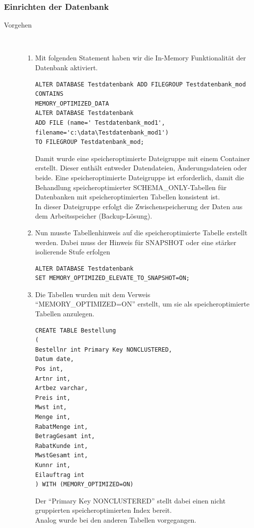\documentclass[a4paper, 12pt]{scrartcl}
\begin{document}
\subsubsection{Einrichten der Datenbank}
\begin{description}
	\item[Vorgehen]~\par 
	\begin{enumerate}
		\item Mit folgenden Statement haben wir die In-Memory Funktionalität der Datenbank aktiviert. 
		\begin{verbatim}
ALTER DATABASE Testdatenbank ADD FILEGROUP Testdatenbank_mod CONTAINS 
MEMORY_OPTIMIZED_DATA   
ALTER DATABASE Testdatenbank 
ADD FILE (name=' Testdatenbank_mod1', filename='c:\data\Testdatenbank_mod1') 
TO FILEGROUP Testdatenbank_mod;   
		\end{verbatim}
		Damit wurde eine speicheroptimierte Dateigruppe mit einem Container erstellt. Dieser enthält entweder Datendateien, Änderungsdateien oder beide. Eine speicheroptimierte Dateigruppe ist erforderlich, damit die Behandlung speicheroptimierter SCHEMA_ONLY-Tabellen für Datenbanken mit speicheroptimierten Tabellen konsistent ist.\\ 
		In dieser Dateigruppe erfolgt die Zwischenspeicherung der Daten aus dem Arbeitsspeicher (Backup-Lösung). 
		\item Nun musste Tabellenhinweis auf die speicheroptimierte Tabelle erstellt werden. Dabei muss der Hinweis für SNAPSHOT oder eine stärker isolierende Stufe erfolgen
		\begin{verbatim}
ALTER DATABASE Testdatenbank 
SET MEMORY_OPTIMIZED_ELEVATE_TO_SNAPSHOT=ON;  
		\end{verbatim}
		\item Die Tabellen wurden mit dem Verweis "`MEMORY_OPTIMIZED=ON"' erstellt, um sie als speicheroptimierte Tabellen anzulegen. 
		\begin{verbatim}
CREATE TABLE Bestellung 
(
Bestellnr int Primary Key NONCLUSTERED,
Datum date,
Pos int,
Artnr int,
Artbez varchar,
Preis int,
Mwst int,
Menge int,
RabatMenge int,
BetragGesamt int,
RabatKunde int,
MwstGesamt int,
Kunnr int,
Eilauftrag int
) WITH (MEMORY_OPTIMIZED=ON)

		\end{verbatim}
		Der "`Primary Key NONCLUSTERED"' stellt dabei einen nicht gruppierten speicheroptimierten Index bereit. \\ Analog wurde bei den anderen Tabellen vorgegangen.	
		
	\end{enumerate}
\end{description}
 
\end{document}
